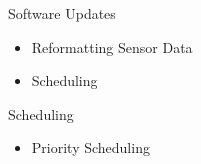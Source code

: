 \begin{frame}{Software Updates}
    \begin{itemize}
        \item Reformatting Sensor Data
        \item Scheduling
    \end{itemize}    
\end{frame}

\begin{frame}{Scheduling}
    \begin{itemize}
        \item Priority Scheduling
    \end{itemize}    
\end{frame}


